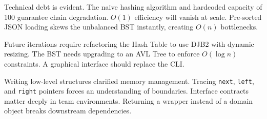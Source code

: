 \documentclass[11pt,a4paper]{article}
\begin{document}
Technical debt is evident. The naive hashing algorithm and hardcoded capacity of 100 guarantee chain degradation. $O(1)$ efficiency will vanish at scale. Pre-sorted JSON loading skews the unbalanced BST instantly, creating $O(n)$ bottlenecks.

Future iterations require refactoring the Hash Table to use DJB2 with dynamic resizing. The BST needs upgrading to an AVL Tree to enforce $O(\log n)$ constraints. A graphical interface should replace the CLI.

Writing low-level structures clarified memory management. Tracing \texttt{next}, \texttt{left}, and \texttt{right} pointers forces an understanding of boundaries. Interface contracts matter deeply in team environments. Returning a wrapper instead of a domain object breaks downstream dependencies.
\end{document}
